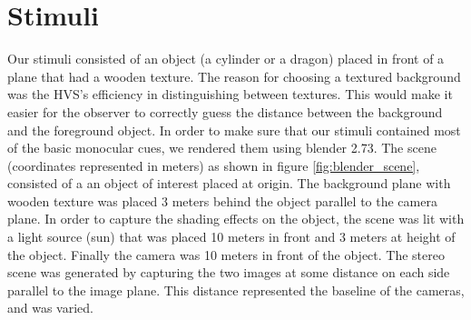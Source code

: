 \section{Stimuli}
Our stimuli consisted of an object (a cylinder or a dragon) placed in front of a plane that had a wooden texture. The reason for choosing a textured background was the HVS's efficiency in distinguishing between textures. This would make it easier for the observer to correctly guess the distance between the background and the foreground object. In order to make sure that our stimuli contained most of the basic monocular cues, we rendered them using blender 2.73.
The scene (coordinates represented in meters) as shown in figure \ref{fig:blender_scene}, consisted of a an object of interest placed at origin. The background plane with wooden texture was placed 3 meters behind the object parallel to the camera plane. In order to capture the shading effects on the object, the scene was lit with a light source (sun) that was placed 10 meters in front and 3 meters at height of the object. Finally the camera was 10 meters in front of the object. The stereo scene was generated by capturing the two images at some distance on each side parallel to the image plane. This distance represented the baseline of the cameras, and was varied.

